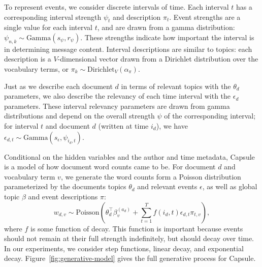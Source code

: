 To represent events, we consider discrete intervals of time.  Each interval $t$ has a corresponding interval strength $\psi_t$ and description $\pi_t$.  Event strengths are a single value for each interval $t$, and are drawn from a gamma distribution: $\psi_{n,k} \sim \mbox{Gamma}(s_\psi, r_\psi)$.  These strengths indicate how important the interval is in determining message content.  Interval descriptions are similar to topics: each description is a $V$-dimensional vector drawn from a Dirichlet distribution over the vocabulary terms, or $\pi_k \sim \mbox{Dirichlet}_V (\alpha_\pi).$

Just as we describe each document $d$ in terms of relevant topics with the $\theta_d$ parameters, we also describe the relevancy of each time interval with the $\epsilon_d$ parameters.  These interval relevancy parameters are drawn from gamma distributions and depend on the overall strength $\psi$ of the corresponding interval; for interval $t$ and document $d$ (written at time $i_d$), we have $\epsilon_{d,t} \sim \mbox{Gamma}(s_\epsilon, \psi_{i_d,t})$.

Conditional on the hidden variables and the author and time metadata, Capsule is a model of how document word counts came to be.  For document $d$ and vocabulary term $v$, we generate the word counts form a Poisson distribution parameterized by the documents topics $\theta_d$ and relevant events $\epsilon$, as well as global topic $\beta$ and event descriptions $\pi$:
\begin{equation}
w_{d,v} \sim \mbox{Poisson}\left(\theta_d^\top\beta^{(a_d)}_v + \sum_{t=1}^T f(i_d, t) \epsilon_{d,t} \pi_{t,v}\right),
\label{eq:generateData}
\end{equation}
where $f$ is some function of decay.  This function is important because events should not remain at their full strength indefinitely, but should decay over time.  In our experiments, we consider step functions, linear decay, and exponential decay.  Figure~\ref{fig:generative-model} gives the full generative process for Capsule.


